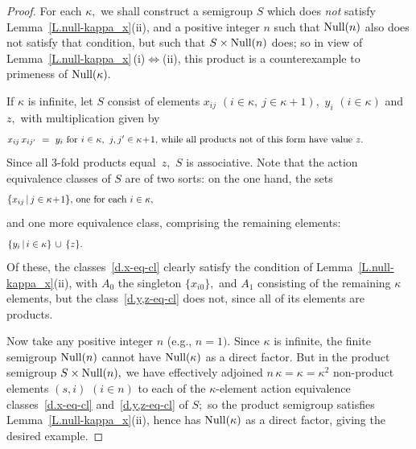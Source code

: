 \documentclass{amsart}
\numberwithin{equation}{section}
\numberwithin{theorem}{section}
\begin{document}
\begin{proof}
For each $\kappa,$ we shall construct a semigroup $S$
which does {\em not} satisfy Lemma~\ref{L.null-kappa_x}(ii), and
a positive integer $n$ such that $\textup{Null}(n)$ also
does not satisfy that condition,
but such that $S\times\textup{Null}(n)$ does; so in
view of Lemma~\ref{L.null-kappa_x}\,(i)\!$\iff$\!(ii), this product
is a counterexample to primeness of $\textup{Null}(\kappa).$

If $\kappa$ is infinite, let $S$ consist of elements
$x_{ij}$ $(i\in\kappa,~j\in\kappa\!+\!1),$ $y_i$ $(i\in\kappa)$
and $z,$ with multiplication given by
%
\begin{equation}\begin{minipage}[c]{35pc}\label{d.xij}
$x_{ij}\,x_{ij'}~=~y_i$ for $i\in\kappa,~j,j'\in\kappa\!+\!1,$ while
all products not of this form have value~$z.$
\end{minipage}\end{equation}
%
Since all $\!3\!$-fold products equal~$z,$ $S$ is associative.
Note that the action equivalence classes of $S$ are of two
sorts: on the one hand, the sets
%
\begin{equation}\begin{minipage}[c]{35pc}\label{d.x-eq-cl}
$\{x_{ij}\,|\,j\in\kappa\!+\!1\},$ one for each $i\in\kappa,$
\end{minipage}\end{equation}
%
and one more equivalence class, comprising the remaining elements:
%
\begin{equation}\begin{minipage}[c]{35pc}\label{d.y,z-eq-cl}
$\{y_i\,|\,i\in\kappa\}\,\cup\,\{z\}.$
\end{minipage}\end{equation}
%
Of these, the classes~\eqref{d.x-eq-cl} clearly satisfy
the condition of Lemma~\ref{L.null-kappa_x}(ii), with $A_0$ the
singleton $\{x_{i0}\},$ and $A_1$ consisting of the remaining $\kappa$
elements, but the class~\eqref{d.y,z-eq-cl} does not,
since all of its elements are products.

Now take any positive integer $n$ (e.g., $n=1).$
Since $\kappa$ is infinite, the finite semigroup $\textup{Null}(n)$
cannot have $\textup{Null}(\kappa)$ as a direct factor.
But in the product semigroup $S\times\textup{Null}(n),$
we have effectively adjoined $n\,\kappa=\kappa=\kappa^2$ non-product
elements $(s,i)$ $(i\in n)$ to each of the $\!\kappa\!$-element
action equivalence classes~\eqref{d.x-eq-cl} and~\eqref{d.y,z-eq-cl}
of $S;$
so the product semigroup satisfies Lemma~\ref{L.null-kappa_x}(ii),
hence has $\textup{Null}(\kappa)$ as a direct factor,
giving the desired example.


\end{proof}
\end{document}
